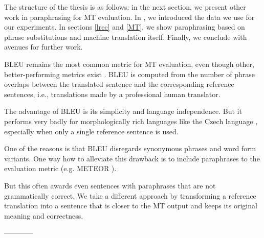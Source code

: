 The structure of the thesis is as follows: in the next section, we present 
other work in paraphrasing for MT evaluation. In , we introduced
the data we use for our experiments. In sections \ref{lrec} and \ref{MT}, 
we show paraphrasing based on phrase substitutions and machine translation 
itself. Finally, we conclude with avenues for further work.





BLEU \cite{bleu} remains the most common metric for MT evaluation, even
though other, better-performing metrics exist \cite{wmt13-metrics}. BLEU is 
computed from the number of phrase overlaps between the translated sentence and 
the corresponding reference sentences, i.e., translations made by a professional 
human translator. 

The advantage of BLEU is its simplicity and language independence. But it performs 
very badly for morphologically rich languages %
like the Czech language \cite{bojar-tackling-sparse-data}, especially when only a 
single reference sentence is used.

One of the reasons is that BLEU %
disregards synonymous phrases and word form variants. One way 
how to  alleviate this drawback is to include paraphrases to the evaluation metric 
(e.g. METEOR \cite{meteor}). 

But this often awards even sentences with paraphrases that are not grammatically correct. 
We take a different approach by transforming a reference translation into a sentence that 
is closer to the MT output and keeps its original meaning and correctness.



------------





